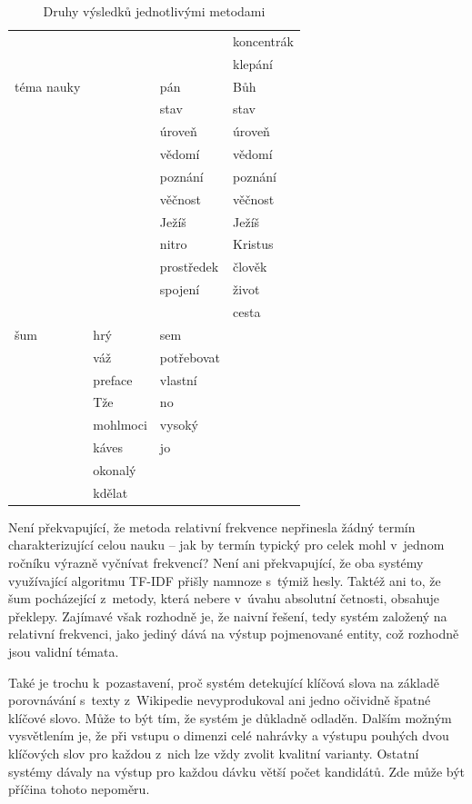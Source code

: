 \begin{table}[htpb]
\begin{center}
\begin{tabular}{|l|l|l|l|}
	& 	& 	& koncentrák \\
	& 	& 	& klepání \\
\hline
  téma nauky	& 	& pán	& Bůh \\
  	& 	& stav	& stav \\
  	& 	& úroveň	& úroveň \\
  	& 	& vědomí	& vědomí \\
  	& 	& poznání	& poznání \\
  	& 	& věčnost	& věčnost \\
  	& 	& Ježíš	& Ježíš \\
  	& 	& nitro	& Kristus \\
  	& 	& prostředek	& člověk \\
  	& 	& spojení	& život \\
  	& 	& 	& cesta \\
\hline
  šum 	& hrý	& sem	&  \\
   	& váž	& potřebovat	& \\
   	& preface	& vlastní	& \\
   	& Tže	& no	& \\
   	& mohlmoci	& vysoký	& \\
   	& káves	& jo	& \\
   	& okonalý	& 	& \\
   	& kdělat	& 	& \\
\hline
\end{tabular}
\caption{Druhy výsledků jednotlivými metodami}
\label{tab:topichits}
\end{center}
\end{table}

Není překvapující, že metoda relativní frekvence nepřinesla žádný termín
charakterizující celou nauku -- jak by termín typický pro celek mohl v~jednom
ročníku výrazně vyčnívat frekvencí? Není ani překvapující, že oba systémy
využívající algoritmu TF-IDF přišly namnoze s~týmiž hesly. Taktéž ani to, že šum
pocházející z~metody, která nebere v~úvahu absolutní četnosti, obsahuje
překlepy. Zajímavé však rozhodně je, že naivní řešení, tedy systém založený na relativní frekvenci,
jako jediný dává na výstup pojmenované entity, což rozhodně
jsou validní témata.

Také je trochu k~pozastavení, proč systém detekující
klíčová slova na základě porovnávání s~texty z~Wikipedie nevyprodukoval ani
jedno očividně špatné klíčové slovo. Může to být tím, že systém je důkladně
odladěn. Dalším možným vysvětlením je, že při vstupu o dimenzi celé nahrávky a
výstupu pouhých dvou klíčových slov pro každou z~nich lze vždy zvolit kvalitní
varianty. Ostatní systémy dávaly na výstup pro každou dávku větší počet
kandidátů. Zde může být příčina tohoto nepoměru.

